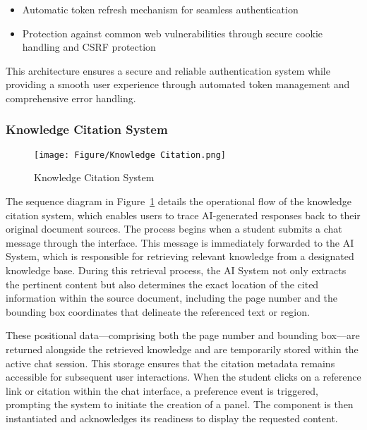 \documentclass[../Main.tex]{subfiles}
\begin{document}
{{\begin{itemize}
		\item Automatic token refresh mechanism for seamless authentication

		\item Protection against common web vulnerabilities through secure cookie handling
			and CSRF protection
	\end{itemize}

	This architecture ensures a secure and reliable authentication system while providing
	a smooth user experience through automated token management and comprehensive error
	handling.

	\subsubsection{Knowledge Citation System}
	\label{section:4.3.2.3_knowledge_citation_system}

	\begin{figure}[H]
		\centering
		\texttt{[image: Figure/Knowledge Citation.png]}
		\caption{Knowledge Citation System}
		\label{fig:Knowledge_Citation_System}
	\end{figure}

	The sequence diagram in Figure~\ref{fig:Knowledge_Citation_System} details the
	operational flow of the knowledge citation system, which enables users to
	trace AI-generated responses back to their original document sources. The process
	begins when a student submits a chat message through the  interface. This message is immediately forwarded to the AI
	System, which is responsible for retrieving relevant knowledge from a designated
	knowledge base. During this retrieval process, the AI System not only extracts
	the pertinent content but also determines the exact location of the cited information
	within the source document, including the page number and the bounding box
	coordinates that delineate the referenced text or region.

	These positional data—comprising both the page number and bounding box—are
	returned alongside the retrieved knowledge and are temporarily stored within
	the active chat session. This storage ensures that the citation metadata remains
	accessible for subsequent user interactions. When the student clicks on a
	reference link or citation within the chat interface, a preference event is triggered,
	prompting the system to initiate the creation of a
	 panel. The  component is then instantiated and acknowledges its readiness to display
	the requested content.

}}
\end{document}
